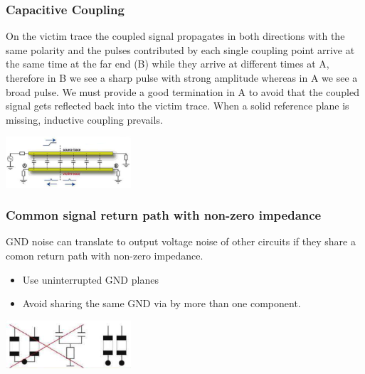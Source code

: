 		\subsubsection{Capacitive Coupling}
			On the victim trace the coupled signal propagates in both directions with the same polarity and the pulses contributed by each single coupling point arrive at the same time at the far end (B) while they arrive at different times at A, therefore in B we see a sharp pulse with strong amplitude whereas in A we see  a broad pulse. We must provide a good termination in A to avoid that the coupled signal gets reflected back into the victim trace. When a solid reference plane is missing, inductive coupling prevails. 
			\begin{center}\includegraphics[width=0.35\textwidth]{images/CapacitiveCoupling.png}\end{center} 

		\subsubsection{Common signal return path with non-zero impedance}
			GND noise can translate to output voltage noise of other circuits if they share a comon return path with non-zero impedance.\\
			\begin{itemize}
				\setlength{\itemsep}{-4pt}
				\item Use uninterrupted GND planes
				\item Avoid sharing the same GND via by more than one component. 
			\end{itemize}
			\begin{center}\includegraphics[width=0.35\textwidth]{images/CommonGNDVia.png}\end{center} 	
			
